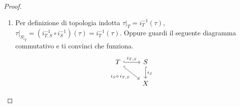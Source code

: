 \begin{proof}
\begin{enumerate}
\begin{proof}
	\end{proof} 
	\begin{proof}
		Dimostro prima che $\bar{W}^{\tau|_S} \subset \bar{W}^\tau \cap S$. \\ $W \subset \bar{W}^\tau \cap S$ poiché $W \subset S$. Inoltre $\bar{W}^\tau \cap S$ è un chiuso in $\tau|_S$, quindi per la definizione di chiusura (e la sua minimalità), dev'essere che $\bar{W}^{\tau|_S} \subset \bar{W}^\tau \cap S$.
		Dimostro $ \bar{W}^\tau \cap S\subset \bar{W}^{\tau|_S}$. Per il punto $2$ esiste un chiuso $C$ di $\tau$ tale che $C \cap S = \bar{W}^{\tau|_S}$. Per cui $W \subset C$ e per l'ipotesi di minimalità della chiusura ho anche che $\bar{W}^\tau \subset C$, e segue $\bar{W}^\tau \cap S \subset C \cap S = \bar{W}^{\tau|_S}$.
	\end{proof}
	\item 
		Per definizione di topologia indotta $\tau|_T = i^{-1}_T(\tau)$, $\tau|_{S|_T} = (i^{-1}_{T,S} \circ i^{-1}_{S}) (\tau) = i^{-1}_T(\tau)$. Oppure guardi il seguente diagramma commutativo e ti convinci che funziona.
		\begin{equation*}
		\begin{tikzcd}
				T \arrow[hook]{r}{i_{T,S}} \arrow[hook,swap]{rd}{i_{S} \circ \, i_{T,S}} & S \arrow[hook]{d}{i_S} \\
																							 & X
		\end{tikzcd}
		\end{equation*}	
\end{enumerate}
\end{proof}

